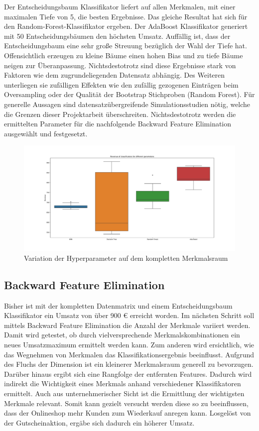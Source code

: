 Der Entscheidungsbaum Klassifikator liefert auf allen Merkmalen, mit einer maximalen Tiefe von 5, die besten Ergebnisse. Das gleiche Resultat hat sich für den Random-Forest-Klassifikator ergeben. Der AdaBoost Klassifikator generiert mit 50 Entscheidungsbäumen den höchsten Umsatz. Auffällig ist, dass der Entscheidungsbaum eine sehr große Streuung bezüglich der Wahl der Tiefe hat. Offensichtlich erzeugen zu kleine Bäume einen hohen Bias und zu tiefe Bäume neigen zur Überanpassung. Nichtsdestotrotz sind diese Ergebnisse stark von Faktoren wie dem zugrundeliegenden Datensatz abhängig. Des Weiteren unterliegen sie zufälligen Effekten wie den zufällig gezogenen Einträgen beim Oversampling oder der Qualität der Bootstrap Stichproben (Random Forest). Für generelle Aussagen sind datensatzübergreifende Simulationsstudien nötig, welche die Grenzen dieser Projektarbeit überschreiten. Nichtsdestotrotz werden die ermittelten Parameter für die nachfolgende Backward Feature Elimination ausgewählt und festgesetzt.




\begin{figure}[H]
  \centering  
  \includegraphics[scale=0.3]{pdf/hyperparameter_1.pdf}
  \caption{Variation der Hyperparameter auf dem kompletten Merkmalsraum}
  \label{fig:hyper}
\end{figure}


\subsection{Backward Feature Elimination}

Bisher ist mit der kompletten Datenmatrix und einem Entscheidungsbaum Klassifikator ein Umsatz von über 900 \euro{} erreicht worden. Im nächsten Schritt soll mittels Backward Feature Elimination die Anzahl der Merkmale variiert werden. Damit wird getestet, ob durch vielversprechende Merkmalskombinationen ein neues Umsatzmaximum ermittelt werden kann. Zum anderen wird ersichtlich, wie das Wegnehmen von Merkmalen das Klassifikationsergebnis beeinflusst. Aufgrund des Fluchs der Dimension ist ein kleinerer Merkmalsraum generell zu bevorzugen. Darüber hinaus ergibt sich eine Rangfolge der entfernten Features. Dadurch wird indirekt die Wichtigkeit eines Merkmals anhand verschiedener Klassifikatoren ermittelt. Auch aus unternehmerischer Sicht ist die Ermittlung der wichtigsten Merkmale relevant. Somit kann gezielt versucht werden diese so zu beeinflussen, dass der Onlineshop mehr Kunden zum Wiederkauf anregen kann. Losgelöst von der Gutscheinaktion, ergäbe sich dadurch ein höherer Umsatz.\\

